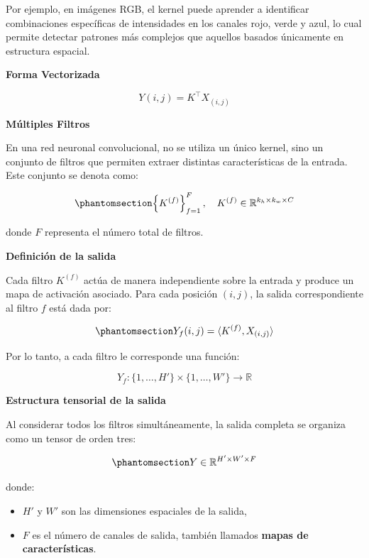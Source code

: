 \documentclass[
  spanish,
  us-letterpaper,
  DIV=11,
  numbers=noendperiod]{scrreprt}
\providecommand{\tightlist}{%
  \setlength{\itemsep}{0pt}\setlength{\parskip}{0pt}}
\begin{document}
Por ejemplo, en imágenes RGB, el kernel puede aprender a identificar
combinaciones específicas de intensidades en los canales rojo, verde y
azul, lo cual permite detectar patrones más complejos que aquellos
basados únicamente en estructura espacial.

\textbf{Forma Vectorizada}

\[
Y(i,j) = K^\top X_{(i,j)}
\]

\textbf{Múltiples Filtros}

En una red neuronal convolucional, no se utiliza un único kernel, sino
un conjunto de filtros que permiten extraer distintas características de
la entrada. Este conjunto se denota como:

\begin{equation}\phantomsection\label{eq-conjunto-filtros}{
\left\{ K^{(f)} \right\}_{f=1}^{F}, \quad
K^{(f)} \in \mathbb{R}^{k_h \times k_w \times C}
}\end{equation}

donde \(F\) representa el número total de filtros.

\textbf{Definición de la salida}

Cada filtro \(K^{(f)}\) actúa de manera independiente sobre la entrada y
produce un mapa de activación asociado. Para cada posición \((i,j)\), la
salida correspondiente al filtro \(f\) está dada por:

\begin{equation}\phantomsection\label{eq-salida-filtro}{
Y_f(i,j) = \langle K^{(f)}, X_{(i,j)} \rangle
}\end{equation}

Por lo tanto, a cada filtro le corresponde una función:

\[
Y_f : \{1,\dots,H'\} \times \{1,\dots,W'\} \to \mathbb{R}
\]

\textbf{Estructura tensorial de la salida}

Al considerar todos los filtros simultáneamente, la salida completa se
organiza como un tensor de orden tres:

\begin{equation}\phantomsection\label{eq-salida-tensor}{
Y \in \mathbb{R}^{H' \times W' \times F}
}\end{equation}

donde:

\begin{itemize}
\tightlist
\item
  \(H'\) y \(W'\) son las dimensiones espaciales de la salida,
\item
  \(F\) es el número de canales de salida, también llamados
  \textbf{mapas de características}.
\end{itemize}
\end{document}
